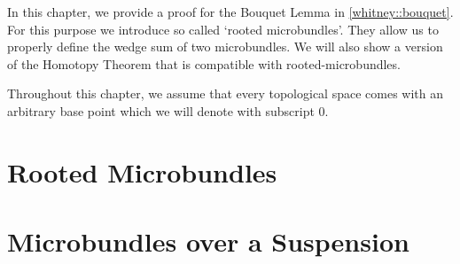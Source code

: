 \begin{myparagraph}
    In this chapter, we provide a proof for the Bouquet Lemma in \ref{whitney::bouquet}.
    For this purpose we introduce so called `rooted microbundles'.
    They allow us to properly define the wedge sum of two microbundles.
    We will also show a version of the Homotopy Theorem
    that is compatible with rooted-microbundles.

    Throughout this chapter,
    we assume that every topological space comes with an arbitrary base point
    which we will denote with subscript $0$.
\end{myparagraph}
\section{Rooted Microbundles}\label{section::rooted}




\section{Microbundles over a Suspension}\label{section::suspension}




